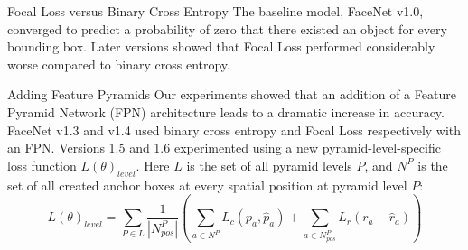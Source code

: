 \documentclass[paperwidth=24in,paperheight=48in, fontscale=0.4166666666666]{baposter}
\begin{document}
\begin{poster}
\begin{posterbox}[name=zeropad,column=0,below=method, above=bottom]{Focal Loss versus Binary Cross Entropy}
\vspace{10pt}\color{black!100}
The baseline model, FaceNet v1.0, converged to predict a probability of zero that there existed an object for every bounding box. Later versions showed that Focal Loss performed considerably worse compared to binary cross entropy.
\end{posterbox}


















\begin{posterbox}[name=experiments,column=1, row=0]{Adding Feature Pyramids}
Our experiments showed that an addition of a Feature Pyramid Network (FPN) \cite{fpn} architecture leads to a dramatic increase in accuracy. FaceNet v1.3 and v1.4 used binary cross entropy and Focal Loss respectively with an FPN. Versions 1.5 and 1.6 experimented using a new pyramid-level-specific loss function $L(\theta)_{level}$. Here $L$ is the set of all pyramid levels $P$, and $N^P$ is the set of all created anchor boxes at every spatial position at pyramid level $P$:
\vspace{-6pt}
\begin{equation}
L(\theta)_{level} = \sum_{P \in L} \frac{1}{|N^P_{pos}|} ( \sum_{a \in N^P} L_c(p_a, \hat{p}_a) +  \sum_{a \in N^P_{pos}} L_r(r_a - \hat{r}_a) )
\end{equation}

\begin{minipage}{0.57\linewidth}
   \centering
   \label{tabseqmnist}
\end{minipage}
\begin{minipage}{0.38\linewidth}
\end{minipage}


\end{posterbox}
\end{poster}
\end{document}

